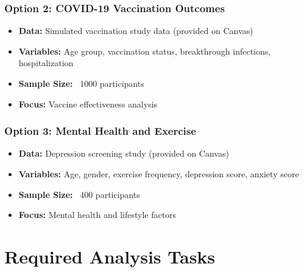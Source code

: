 \documentclass[11pt]{article}
\begin{document}
\subsubsection{Option 2: COVID-19 Vaccination Outcomes}
\begin{itemize}
\item \textbf{Data:} Simulated vaccination study data (provided on Canvas)
\item \textbf{Variables:} Age group, vaccination status, breakthrough infections, hospitalization
\item \textbf{Sample Size:} ~1000 participants
\item \textbf{Focus:} Vaccine effectiveness analysis
\end{itemize}

\subsubsection{Option 3: Mental Health and Exercise}
\begin{itemize}
\item \textbf{Data:} Depression screening study (provided on Canvas)
\item \textbf{Variables:} Age, gender, exercise frequency, depression score, anxiety score
\item \textbf{Sample Size:} ~400 participants
\item \textbf{Focus:} Mental health and lifestyle factors
\end{itemize}

\section{Required Analysis Tasks}
\end{document}
